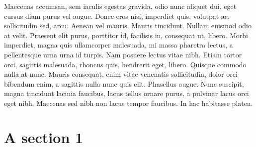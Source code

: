 Maecenas accumsan, sem iaculis egestas gravida, odio nunc aliquet dui, eget
cursus diam purus vel augue. Donec eros nisi, imperdiet quis, volutpat ac,
sollicitudin sed, arcu. Aenean vel mauris. Mauris tincidunt. Nullam euismod odio
at velit. Praesent elit purus, porttitor id, facilisis in, consequat ut, libero.
Morbi imperdiet, magna quis ullamcorper malesuada, mi massa pharetra lectus, a
pellentesque urna urna id turpis. Nam posuere lectus vitae nibh. Etiam tortor
orci, sagittis malesuada, rhoncus quis, hendrerit eget, libero. Quisque commodo
nulla at nunc. Mauris consequat, enim vitae venenatis sollicitudin, dolor orci
bibendum enim, a sagittis nulla nunc quis elit. Phasellus augue. Nunc suscipit,
magna tincidunt lacinia faucibus, lacus tellus ornare purus, a pulvinar lacus
orci eget nibh. Maecenas sed nibh non lacus tempor faucibus. In hac habitasse
platea.


\section{A section 1}
\label{sec:section1chap2}

